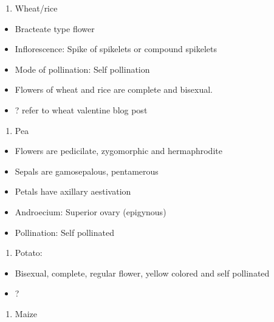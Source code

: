 \documentclass[]{article}
\providecommand{\tightlist}{%
  \setlength{\itemsep}{0pt}\setlength{\parskip}{0pt}}
\begin{document}
\begin{enumerate}
\def\labelenumi{\arabic{enumi}.}
\tightlist
\item
  Wheat/rice
\end{enumerate}

\begin{itemize}
\tightlist
\item
  Bracteate type flower
\item
  Inflorescence: Spike of spikelets or compound spikelets
\item
  Mode of pollination: Self pollination
\item
  Flowers of wheat and rice are complete and bisexual.
\item
  ? refer to wheat valentine blog post
\end{itemize}

\begin{enumerate}
\def\labelenumi{\arabic{enumi}.}
\setcounter{enumi}{1}
\tightlist
\item
  Pea
\end{enumerate}

\begin{itemize}
\tightlist
\item
  Flowers are pedicilate, zygomorphic and hermaphrodite
\item
  Sepals are gamosepalous, pentamerous
\item
  Petals have axillary aestivation
\item
  Androecium: Superior ovary (epigynous)
\item
  Pollination: Self pollinated
\end{itemize}

\begin{enumerate}
\def\labelenumi{\arabic{enumi}.}
\setcounter{enumi}{2}
\tightlist
\item
  Potato:
\end{enumerate}

\begin{itemize}
\tightlist
\item
  Bisexual, complete, regular flower, yellow colored and self pollinated
\item
  ?
\end{itemize}

\begin{enumerate}
\def\labelenumi{\arabic{enumi}.}
\setcounter{enumi}{3}
\tightlist
\item
  Maize
\end{enumerate}
\end{document}
